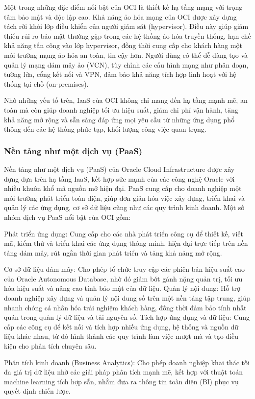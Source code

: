 Một trong những đặc điểm nổi bật của OCI là thiết kế hạ tầng mạng với trọng tâm bảo mật và độc lập cao. Khả năng ảo hóa mạng của OCI được xây dựng tách rời khỏi lớp điều khiển của người giám sát (hypervisor). Điều này giúp giảm thiểu rủi ro bảo mật thường gặp trong các hệ thống ảo hóa truyền thống, hạn chế khả năng tấn công vào lớp hypervisor, đồng thời cung cấp cho khách hàng một môi trường mạng ảo hóa an toàn, tin cậy hơn. Người dùng có thể dễ dàng tạo và quản lý mạng đám mây ảo (VCN), tùy chỉnh các cấu hình mạng như phân đoạn, tường lửa, cổng kết nối và VPN, đảm bảo khả năng tích hợp linh hoạt với hệ thống tại chỗ (on-premises).

Nhờ những yếu tố trên, IaaS của OCI không chỉ mang đến hạ tầng mạnh mẽ, an toàn mà còn giúp doanh nghiệp tối ưu hiệu suất, giảm chi phí vận hành, tăng khả năng mở rộng và sẵn sàng đáp ứng mọi yêu cầu từ những ứng dụng phổ thông đến các hệ thống phức tạp, khối lượng công việc quan trọng.

\subsubsection{Nền tảng như một dịch vụ (PaaS)}
Nền tảng như một dịch vụ (PaaS) của Oracle Cloud Infrastructure được xây dựng dựa trên hạ tầng IaaS, kết hợp sức mạnh của các công nghệ Oracle với nhiều khuôn khổ mã nguồn mở hiện đại. PaaS cung cấp cho doanh nghiệp một môi trường phát triển toàn diện, giúp đơn giản hóa việc xây dựng, triển khai và quản lý các ứng dụng, cơ sở dữ liệu cũng như các quy trình kinh doanh. Một số nhóm dịch vụ PaaS nổi bật của OCI gồm:

\begin{myitem}
    \item Phát triển ứng dụng: Cung cấp cho các nhà phát triển công cụ để thiết kế, viết mã, kiểm thử và triển khai các ứng dụng thông minh, hiện đại trực tiếp trên nền tảng đám mây, rút ngắn thời gian phát triển và tăng khả năng mở rộng.
    
    \item Cơ sở dữ liệu đám mây: Cho phép tổ chức truy cập các phiên bản hiệu suất cao của Oracle Autonomous Database, nhờ đó giảm bớt gánh nặng quản trị, tối ưu hóa hiệu suất và nâng cao tính bảo mật của dữ liệu.
    Quản lý nội dung: Hỗ trợ doanh nghiệp xây dựng và quản lý nội dung số trên một nền tảng tập trung, giúp nhanh chóng cá nhân hóa trải nghiệm khách hàng, đồng thời đảm bảo tính nhất quán trong quản lý dữ liệu và tài nguyên số.
    Tích hợp ứng dụng và dữ liệu: Cung cấp các công cụ để kết nối và tích hợp nhiều ứng dụng, hệ thống và nguồn dữ liệu khác nhau, từ đó hình thành các quy trình làm việc mượt mà và tạo điều kiện cho phân tích chuyên sâu.

    \item Phân tích kinh doanh (Business Analytics): Cho phép doanh nghiệp khai thác tối đa giá trị dữ liệu nhờ các giải pháp phân tích mạnh mẽ, kết hợp với thuật toán machine learning tích hợp sẵn, nhằm đưa ra thông tin toàn diện (BI) phục vụ quyết định chiến lược.
    
\end{myitem}

